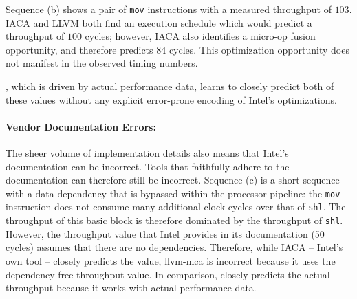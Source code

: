 Sequence (b) shows a pair of \texttt{mov} instructions with a measured throughput of $103$.
IACA and LLVM both find an execution schedule which would predict a throughput of $100$ cycles; however, IACA also identifies a micro-op fusion opportunity, and therefore predicts $84$ cycles.
This optimization opportunity does not manifest in the observed timing numbers.

\tool{}, which is driven by actual performance data, learns to closely predict both of these values without any explicit error-prone encoding of Intel's optimizations.

\paragraph{Vendor Documentation Errors:}
The sheer volume of implementation details also means that Intel's documentation can be incorrect.
Tools that faithfully adhere to the documentation can therefore still be incorrect.
Sequence (c) is a short sequence with a data dependency that is bypassed within the processor pipeline: the \texttt{mov} instruction does not consume many additional clock cycles over that of \texttt{shl}.
The throughput of this basic block is therefore dominated by the throughput of \texttt{shl}.
However, the throughput value that Intel provides in its documentation (50 cycles) assumes that there are no dependencies.
Therefore, while IACA -- Intel's own tool -- closely predicts the value, llvm-mca is incorrect because it uses the dependency-free throughput value.
In comparison, \tool{} closely predicts the actual throughput because it works with actual performance data.
